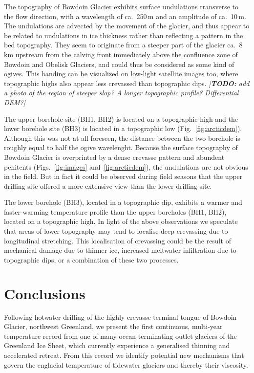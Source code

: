 \documentclass[utf8]{article}
\newcommand{\todo}[1]{\textcolor{c3}{\emph{[\textbf{TODO:} #1]}}}
\begin{document}
    The topography of Bowdoin Glacier exhibits surface undulations transverse
    to the flow direction, with a wavelength of ca.~250\,m and an amplitude of
    ca.~10\,m. The undulations are advected by the movement of the glacier, and
    thus appear to be related to undulations in ice thickness rather than
    reflecting a pattern in the bed topography. They seem to originate from a
    steeper part of the glacier ca.~8\,km upstream from the calving front
    immediately above the confluence zone of Bowdoin and Obelisk Glaciers, and
    could thus be considered as some kind of ogives. This banding can be
    visualized on low-light satellite images too, where topographic highs also
    appear less crevassed than topographic dips.
    \todo{add a photo of the region of steeper slop? A longer topographic
          profile? Differential DEM?}

    The upper borehole site (BH1, BH2) is located on a topographic high and the
    lower borehole site (BH3) is located in a topographic low
    (Fig.~\ref{fig:arcticdem}). Although this
    was not at all foreseen, the distance between the two borehole is roughly
    equal to half the ogive wavelenght. Because the surface topography of
    Bowdoin Glacier is overprinted by a dense crevasse pattern and abundent
    penitents (Figs.~\ref{fig:images} and~\ref{fig:arcticdem}), the undulations
    are not obvious in the field.  But in fact it
    could be observed during field seasons that the upper drilling site offered
    a more extensive view than the lower drilling site.

    The lower borehole (BH3), located in a topographic dip, exhibits a warmer
    and faster-warming temperature profile than the upper boreholes (BH1, BH2),
    located on a topographic high. In light of the above observations we
    speculate that areas of lower topography may tend to localise deep
    crevassing due to longitudinal stretching. This localisation of crevassing
    could be the result of mechanical damage due to thinner ice, increased
    meltwater infiltration due to topographic dips, or a combination of these
    two processes.


\section{Conclusions}

    Following hotwater drilling of the highly crevasse terminal tongue of
    Bowdoin Glacier, northwest Greenland, we present the first continuous,
    multi-year temperature record from one of many ocean-terminating outlet
    glaciers of the Greenland Ice Sheet, which currently experience a
    generalised thinning and accelerated retreat. From this record we identify
    potential new mechanisms that govern the englacial temperature of tidewater
    glaciers and thereby their viscosity.
\end{document}
